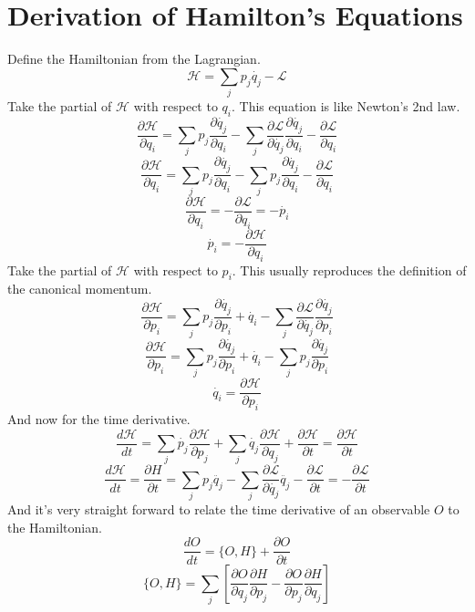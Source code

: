 \documentclass[a4paper,12pt]{
article}
\newcommand{\partialderiv}[2]{ \frac{ \partial #1 }{ \partial #2 } }
\begin{document}
\section*{Derivation of Hamilton's Equations}
Define the Hamiltonian from the Lagrangian.
\[ \mathcal{H} = \sum_j p_j \dot{q_j} - \mathcal{L} \]
Take the partial of $\mathcal{H}$ with respect to $q_i$.  This equation is like Newton's 2nd law.
\[ \partialderiv{ \mathcal{H} }{ q_i } =
\sum_j p_j \partialderiv{ \dot{q_j} }{ q_i } -
\sum_j \partialderiv{ \mathcal{L} }{ \dot{q_j} }
\partialderiv{ \dot{q_j} }{ q_i } -
\partialderiv{ \mathcal{L} }{ q_i } \]
\[ \partialderiv{ \mathcal{H} }{ q_i } =
\sum_j p_j \partialderiv{ \dot{q_j} }{ q_i } -
\sum_j p_j \partialderiv{ \dot{q_j} }{ q_i } -
\partialderiv{ \mathcal{L} }{ q_i } \]
\[ \partialderiv{ \mathcal{H} }{ q_i } = -
\partialderiv{ \mathcal{L} }{ q_i } = - \dot{p_i} \]
\[ \dot{p_i} = - \partialderiv{ \mathcal{H} }{ q_i } \]
Take the partial of $\mathcal{H}$ with respect to $p_i$.  This usually reproduces the definition of the canonical momentum.
\[ \partialderiv{ \mathcal{H} }{ p_i } =
\sum_j p_j \partialderiv{ \dot{q_j} }{ p_i } +
\dot{q_i} - \sum_j \partialderiv{ \mathcal{L} }{ \dot{q_j} }
\partialderiv{ \dot{q_j} }{ p_i } \]
\[ \partialderiv{ \mathcal{H} }{ p_i } = \sum_j p_j
\partialderiv{ \dot{q_j} }{ p_i } +
\dot{q_i} - \sum_j p_j \partialderiv{ \dot{q_j} }{ p_i } \]
\[ \dot{q_i} = \partialderiv{ \mathcal{H} }{ p_i } \]
And now for the time derivative.
\[ \frac{ d \mathcal{H} }{ dt } = \sum_j \dot{p_j} \partialderiv{ \mathcal{H} }{ p_j } + \sum_j \dot{q_j} \partialderiv{ \mathcal{H} }{ q_j } + \partialderiv{ \mathcal{H} }{ t } = \partialderiv{ \mathcal{H} }{ t } \]
\[ \frac{ d \mathcal{H} }{ dt } = \partialderiv{H}{t} = \sum_j p_j \ddot{q_j} - \sum_j \partialderiv{ \mathcal{L} }{ \dot{q_j} } \ddot{q_j} - \partialderiv{ \mathcal{L} }{ t } = - \partialderiv{ \mathcal{L} }{ t }\]
And it's very straight forward to relate the time derivative of an observable $O$ to the Hamiltonian.
\[ \frac{dO}{dt} = \{O,H\} + \partialderiv{O}{t} \]
\[ \{O,H\} = \sum_j \left[ \partialderiv{O}{q_j} \partialderiv{H}{p_j} - \partialderiv{O}{p_j} \partialderiv{H}{q_j} \right] \]
\end{document}
